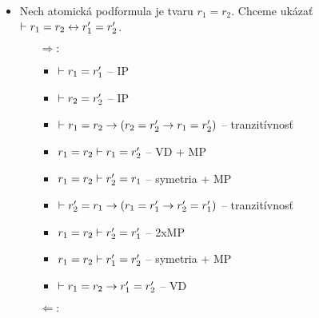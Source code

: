 \begin{dokaz}
\begin{itemize}
\begin{itemize}
\begin{itemize}
\begin{itemize}
                \end{itemize}
            \end{itemize}
        \item Nech atomická podformula je tvaru $r_1 = r_2$. Chceme
        ukázať $\vdash r_1=r_2 \leftrightarrow r_1'=r_2'$.
            \begin{itemize}
            \item[$\Rightarrow:$]
                \begin{itemize}
                \item $\vdash r_1=r_1'$ -- IP
                \item $\vdash r_2=r_2'$ -- IP
                \item $\vdash r_1 = r_2 \rightarrow (
                            r_2 = r_2' \rightarrow r_1 = r_2')$ --
                            tranzitívnosť
                \item $r_1=r_2 \vdash r_1=r_2'$ -- VD + MP
                \item $r_1=r_2 \vdash r_2'=r_1$ -- symetria + MP
                \item $\vdash r_2' = r_1 \rightarrow (
                            r_1 = r_1' \rightarrow r_2' = r_1')$ --
                            tranzitívnosť
                \item $r_1=r_2 \vdash r_2' = r_1'$ -- 2xMP
                \item $r_1=r_2 \vdash r_1' = r_2'$ -- symetria + MP
                \item $\vdash r_1=r_2 \rightarrow r_1'=r_2'$ -- VD
                \end{itemize}
            \item[$\Leftarrow:$]
\end{itemize}
\end{itemize}
\end{itemize}
\end{dokaz}
